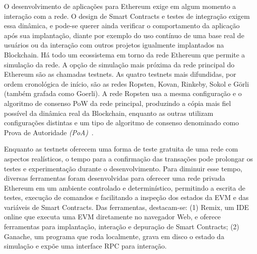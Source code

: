 \documentclass[a4paper,11pt]{article}
\begin{document}
O desenvolvimento de aplicações para Ethereum exige em algum momento a interação com a rede.
O design de Smart Contracts e testes de integração exigem essa dinâmica, e pode-se querer ainda verificar o comportamento da aplicação após sua implantação, diante por exemplo do uso contínuo de uma base real de usuários ou da interação com outros projetos igualmente implantados na Blockchain.
Há todo um ecossistema em torno da rede Ethereum que permite a simulação da rede. %
A opção de simulação mais próxima da rede principal do Ethereum são as chamadas testnets.
As quatro testnets mais difundidas, por ordem cronológica de início, são as redes Ropsten, Kovan, Rinkeby, Sokol e Görli (também grafada como Goerli).
A rede Ropsten usa a mesma configuração e o algoritmo de consenso PoW da rede principal, produzindo a cópia mais fiel possível da dinâmica real da Blockchain, enquanto as outras utilizam configurações distintas e um tipo de algoritmo de consenso denominado como Prova de Autoridade \emph{(PoA)}~\cite{DeAngelis2018}.


Enquanto as testnets oferecem uma forma de teste gratuita de uma rede com aspectos realísticos, o tempo para a confirmação das transações pode prolongar os testes e experimentação durante o desenvolvimento.
Para diminuir esse tempo, diversas ferramentas foram desenvolvidas para oferecer uma rede privada Ethereum em um ambiente controlado e determinístico, permitindo a escrita de testes, execução de comandos e facilitando a inspeção dos estados da EVM e das variáveis de Smart Contracts.
Das ferramentas, destacam-se:
(1) Remix, um IDE online que executa uma EVM diretamente no navegador Web, e oferece ferramentas para implantação, interação e depuração de Smart Contracts;
(2) Ganache, um programa que roda localmente, grava em disco o estado da simulação e expõe uma interface RPC para interação.
\end{document}
